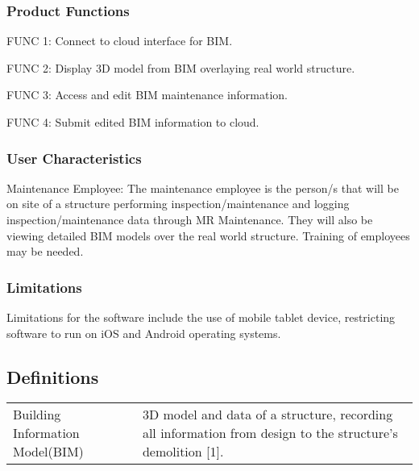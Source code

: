 \documentclass[onecolumn, draftclsnofoot,10pt, compsoc]{IEEEtran}
\begin{document}
            \subsubsection{Product Functions}
                   \hspace{10mm}FUNC 1: \hspace{10mm}Connect to cloud interface for BIM.\par
                   \hspace{10mm}FUNC 2: \hspace{10mm}Display 3D model from BIM overlaying real world structure.\par
                   \hspace{10mm}FUNC 3: \hspace{10mm}Access and edit BIM maintenance information.\par
                   \hspace{10mm}FUNC 4: \hspace{10mm}Submit edited BIM information to cloud.\par
            
            \subsubsection{User Characteristics}
               \hangindent=10mm\noindent Maintenance Employee: The maintenance employee is the person/s that will be on site of a structure performing inspection/maintenance and logging inspection/maintenance data through MR Maintenance. They will also be viewing detailed BIM models over the real world structure. Training of employees may be needed.\par
            
            
            \subsubsection{Limitations}
            \hangindent=10mm\noindent Limitations for the software include the use of mobile tablet device, restricting software to run on iOS and Android operating systems.\par
    \subsection{Definitions}
            \begin{table}[ht]
                \hspace{10mm}
                \begin{tabular}{l p{100mm}}
                   Building Information Model(BIM) & 3D model and data of a structure, recording all information from design to the structure's demolition [1].
                \end{tabular}
            \end{table}
\end{document}
